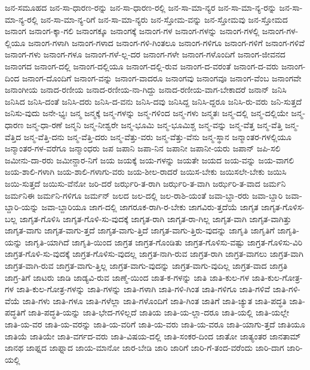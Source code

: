 {ಜನ-ಸಮೂಹದ
ಜನ-ಸಾ-ಧಾರಣ-ರನ್ನು
ಜನ-ಸಾ-ಧಾರಣ-ರಲ್ಲಿ
ಜನ-ಸಾ-ಮಾ-ನ್ಯರ
ಜನ-ಸಾ-ಮಾ-ನ್ಯ-ರನ್ನು
ಜನ-ಸಾ-ಮಾ-ನ್ಯ-ರಲ್ಲಿ
ಜನ-ಸಾ-ಮಾ-ನ್ಯ-ರಿಗೆ
ಜನ-ಸಾ-ಮಾ-ನ್ಯರು
ಜನ-ಸ್ತೋಮ-ವನ್ನು
ಜನ-ಸ್ತೋಮವು
ಜನ-ಸ್ತೋಮದ
ಜನಾಂಗ
ಜನಾಂಗ-ಕ್ಕಾ-ಗಲಿ
ಜನಾಂಗಕ್ಕೂ
ಜನಾಂಗಕ್ಕೆ
ಜನಾಂಗ-ಗಳ
ಜನಾಂಗ-ಗಳನ್ನು
ಜನಾಂಗ-ಗಳಲ್ಲಿ
ಜನಾಂಗ-ಗಳ-ಲ್ಲಿಯೂ
ಜನಾಂಗ-ಗಳಾಗಿ
ಜನಾಂಗ-ಗಳಾದ
ಜನಾಂಗ-ಗಳಿ-ಗಿಂತಲೂ
ಜನಾಂಗ-ಗಳಿಗೂ
ಜನಾಂಗ-ಗಳಿಗೆ
ಜನಾಂಗ-ಗಳಿವೆ
ಜನಾಂಗ-ಗಳು
ಜನಾಂಗ-ಗಳೂ
ಜನಾಂಗ-ಗಳೆ-ಲ್ಲ-ದರ
ಜನಾಂಗ-ಗಳೇ
ಜನಾಂಗ-ಗಳೊಂದಿಗೆ
ಜನಾಂಗ-ಜೀವನದ
ಜನಾಂಗದ
ಜನಾಂಗ-ದಲ್ಲಿ
ಜನಾಂಗ-ದಲ್ಲಿಯೂ
ಜನಾಂಗ-ದಲ್ಲಿ-ರುವ
ಜನಾಂಗ-ದ-ವರಂತೆ
ಜನಾಂಗ-ದ-ವರು
ಜನಾಂಗ-ದಿಂದ
ಜನಾಂಗ-ದೊಂದಿಗೆ
ಜನಾಂಗ-ವನ್ನು
ಜನಾಂಗ-ವಾದರೂ
ಜನಾಂಗವು
ಜನಾಂಗವೂ
ಜನಾಂಗ-ವೆಂಬ
ಜನಾಂಗವೇ
ಜನಾಂಗೀಯ
ಜನಾದ-ರಣೀಯ
ಜನಾದ-ರಣೀಯ-ನಾ-ಗಿದ್ದು
ಜನಾದ-ರಣೀಯ-ವಾಗ-ಬೇಕಾದರೆ
ಜನಾನ್
ಜನಿಸಿ
ಜನಿಸಿದ
ಜನಿಸಿ-ದಂತೆ
ಜನಿಸಿ-ದರು
ಜನಿಸಿ-ದ-ವನು
ಜನಿಸಿ-ದವು
ಜನಿಸಿದ್ದ
ಜನಿಸಿ-ದ್ದರೂ
ಜನಿಸಿ-ರು-ವರು
ಜನಿ-ಸುತ್ತದೆ
ಜನಿಸು-ವುದು
ಜನೇ-ಭ್ಯಃ
ಜನ್ಮ
ಜನ್ಮಕ್ಕೆ
ಜನ್ಮ-ಗಳನ್ನು
ಜನ್ಮ-ಗಳಿಂದ
ಜನ್ಮ-ಗಳು
ಜನ್ಮತಃ
ಜನ್ಮ-ದಲ್ಲಿ
ಜನ್ಮ-ದಲ್ಲಿಯೇ
ಜನ್ಮ-ಧಾರಣ
ಜನ್ಮ-ಧಾ-ರಣೆ
ಜನ್ಮನಿ
ಜನ್ಮ-ನೀಶ್ವರೇ
ಜನ್ಮ-ಭೂಮಿ
ಜನ್ಮ-ಭೂಮಿಶ್ಚ
ಜನ್ಮ-ವನ್ನು
ಜನ್ಮ-ವೆತ್ತ
ಜನ್ಮ-ವೆತ್ತಿ
ಜನ್ಮ-ವೆತ್ತಿದ
ಜನ್ಮ-ವೆತ್ತಿ-ದನು
ಜನ್ಮ-ವೆತ್ತಿ-ದರು
ಜನ್ಮ-ವೆತ್ತು-ವರು
ಜನ್ಮ-ವೆತ್ತು-ವೆನು
ಜನ್ಮ-ಸ್ಥಾನ
ಜನ್ಮಾಂತರ-ಗಳಲ್ಲಿಯೂ
ಜನ್ಮಾಂತರ-ಗಳ-ವರೆಗೂ
ಜನ್ಮಾಂಧರು
ಜಪ
ಜಪಾನಿ
ಜಪಾ-ನಿನ
ಜಪಾನೀ
ಜಪಾನೀ-ಯರು
ಜಪಾನ್
ಜಪಿ-ಸಲಿ
ಜಮೀನು-ದಾ-ರರು
ಜಮೀನ್ದಾರ-ನಿಗೆ
ಜಯ
ಜಯಕ್ಕೆ
ಜಯ-ಗಳನ್ನು
ಜಯತೇ
ಜಯದ
ಜಯ-ವನ್ನು
ಜಯ-ವಾಗಲಿ
ಜಯ-ಶಾಲಿ-ಗಳಾಗಿ
ಜಯ-ಶಾಲಿ-ಗಳಾಗು-ವರು
ಜಯ-ಶೀಲ-ರಾದರೆ
ಜಯಿಸ-ಬೇಕು
ಜಯಿಸಲೇ-ಬೇಕು
ಜಯಿಸಿ
ಜಯಿ-ಸುತ್ತದೆ
ಜಯಿಸು-ವೆನೋ
ಜರಿ-ದರೆ
ಜರ್ಝರಿ-ತ-ರಾಗಿ
ಜರ್ಝರಿ-ತ-ವಾಗಿ
ಜರ್ಝರಿ-ತ-ವಾದ
ಜರ್ಮನಿ
ಜರ್ಮನಿಈ
ಜರ್ಮನಿ-ಗಳಿಗೂ
ಜರ್ಮನ್
ಜಲದ
ಜಲ-ದಲ್ಲಿ
ಜಲ-ರಾಶಿ-ಯಂತೆ
ಜವಾ-ಬ್ದಾ-ರರು
ಜವಾ-ಬ್ದಾರಿ
ಜವಾ-ಬ್ದಾರಿ-ಯನ್ನು
ಜವಾ-ಬ್ದಾರಿಯೂ
ಜಾಗ-ದಲ್ಲಿ
ಜಾಗರೂಕ-ರಾಗಿ-ರ-ಬೇಕು
ಜಾಗವಿರು-ತ್ತದೆಯೆ
ಜಾಗೃತ
ಜಾಗೃತ-ಗೊಳಿಸ-ಬಲ್ಲ
ಜಾಗೃತ-ಗೊಳಿಸಿ
ಜಾಗೃತ-ಗೊಳಿ-ಸು-ವುದಕ್ಕೆ
ಜಾಗೃತ-ರಾಗಿ
ಜಾಗೃತ-ರಾ-ಗಿಲ್ಲ
ಜಾಗೃತ-ವಾಗಿ
ಜಾಗೃತ-ವಾಗಿತ್ತು
ಜಾಗೃತ-ವಾಗು
ಜಾಗೃತ-ವಾಗು-ತ್ತದೆ
ಜಾಗೃತ-ವಾಗು-ತ್ತಿದೆ
ಜಾಗೃತ-ವಾಗು-ತ್ತಿರು-ವುದನ್ನು
ಜಾಗೃತಿ
ಜಾಗೃತಿಗೆ
ಜಾಗೃತಿ-ಯನ್ನು
ಜಾಗೃತಿ-ಯಾಗಿದೆ
ಜಾಗೃತಿ-ಯಿಂದ
ಜಾಗ್ರತ
ಜಾಗ್ರತ-ಗೊಂಡಿತು
ಜಾಗ್ರತ-ಗೊಳಿಸು-ವಷ್ಟು
ಜಾಗ್ರತ-ಗೊಳಿಸು-ವಿರಿ
ಜಾಗ್ರತ-ಗೊಳಿ-ಸು-ವುದಕ್ಕೆ
ಜಾಗ್ರತ-ಗೊಳಿಸು-ವುದಲ್ಲ
ಜಾಗ್ರತ-ನಾಗಿ-ರುವ
ಜಾಗ್ರತ-ರಾಗಿ
ಜಾಗ್ರತ-ವಾಗಲು
ಜಾಗ್ರತ-ವಾಗಿ
ಜಾಗ್ರತ-ವಾಗಿ-ರುವ
ಜಾಗ್ರತ-ವಾಗು-ತ್ತಿಲ್ಲ
ಜಾಗ್ರತ-ವಾಗು-ವುದನ್ನು
ಜಾಗ್ರತ-ವಾಗು-ವುದಿಲ್ಲ
ಜಾಗ್ರತ-ವಾದ
ಜಾಗ್ರತಿ
ಜಾಗ್ರ-ತಿಗೆ
ಜಾಟರು
ಜಾಡಿ
ಜಾಡ್ಯವಿ-ರುವ
ಜಾಣ್ಮೆ-ಯಿಂದ
ಜಾತ-ಕ-ಗಳನ್ನು
ಜಾತಿ
ಜಾತಿ-ಕುಲ-ಗಳ
ಜಾತಿ-ಕುಲ-ಗೋತ್ರ-ಗಳ
ಜಾತಿ-ಕುಲ-ಗೋತ್ರ-ಗಳನ್ನು
ಜಾತಿ-ಗಳನ್ನು
ಜಾತಿ-ಗಳಾಗಿ
ಜಾತಿ-ಗಳಿ-ಗಿಂತ
ಜಾತಿ-ಗಳಿಗೂ
ಜಾತಿ-ಗಳಿವೆ
ಜಾತಿ-ಗಳಿ-ವೆಯೆ
ಜಾತಿ-ಗಳು
ಜಾತಿ-ಗಳೂ
ಜಾತಿ-ಗಳೆಲ್ಲಾ
ಜಾತಿ-ಗಳೊಂದಿಗೆ
ಜಾತಿ-ಗಿಂತ
ಜಾತಿಗೆ
ಜಾತಿ-ಚ್ಯುತ
ಜಾತಿ-ಪದ್ಧತಿ
ಜಾತಿ-ಪದ್ಧತಿಗೆ
ಜಾತಿ-ಪದ್ಧತಿ-ಯನ್ನು
ಜಾತಿ-ಭೇದ-ಗಳಿಲ್ಲದೆ
ಜಾತಿಯ
ಜಾತಿ-ಯ-ಲ್ಲಾ-ದರೂ
ಜಾತಿ-ಯಲ್ಲಿ
ಜಾತಿ-ಯಲ್ಲೇ
ಜಾತಿ-ಯ-ವರ
ಜಾತಿ-ಯ-ವರನ್ನು
ಜಾತಿ-ಯ-ವರಿಗೆ
ಜಾತಿ-ಯ-ವರು
ಜಾತಿ-ಯ-ವರೂ
ಜಾತಿ-ಯಾಗು-ತ್ತದೆ
ಜಾತಿಯೂ
ಜಾತಿಯೆ
ಜಾತಿಯೇ
ಜಾತಿ-ವರ್ಗದ-ವರು
ಜಾತಿ-ವಿಷಯ-ದಲ್ಲಿ
ಜಾತಿ-ಸಂಕರ-ದಿಂದ
ಜಾತೋ
ಜಾತ್ಯಂತರ
ಜಾನತಾಮ್
ಜಾನಥ
ಜಾಫ್ನದ
ಜಾಫ್ನಾದ
ಜಾಯ-ಮಾನೋ
ಜಾರ-ಬೇಡಿ
ಜಾರಿ
ಜಾರಿಗೆ
ಜಾರಿ-ಗೆ-ತಂದ-ವರೆಂದು
ಜಾರಿ-ದಾಗ
ಜಾರಿ-ಯಲ್ಲಿ
}
